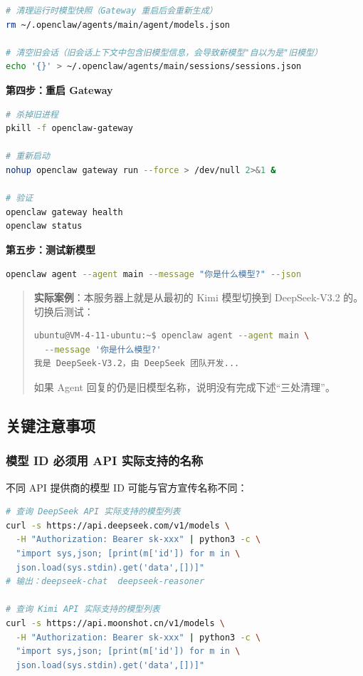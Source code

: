 \begin{lstlisting}[language=bash]
# 清理运行时模型快照（Gateway 重启后会重新生成）
rm ~/.openclaw/agents/main/agent/models.json

# 清空旧会话（旧会话上下文中包含旧模型信息，会导致新模型"自以为是"旧模型）
echo '{}' > ~/.openclaw/agents/main/sessions/sessions.json
\end{lstlisting}

\textbf{第四步：重启 Gateway}

\begin{lstlisting}[language=bash]
# 杀掉旧进程
pkill -f openclaw-gateway

# 重新启动
nohup openclaw gateway run --force > /dev/null 2>&1 &

# 验证
openclaw gateway health
openclaw status
\end{lstlisting}

\textbf{第五步：测试新模型}

\begin{lstlisting}[language=bash]
openclaw agent --agent main --message "你是什么模型?" --json
\end{lstlisting}

\begin{quote}
\textbf{实际案例}：本服务器上就是从最初的 Kimi 模型切换到 DeepSeek-V3.2 的。切换后测试：
\begin{lstlisting}[language=bash]
ubuntu@VM-4-11-ubuntu:~$ openclaw agent --agent main \
  --message '你是什么模型?'
我是 DeepSeek-V3.2，由 DeepSeek 团队开发...
\end{lstlisting}
如果 Agent 回复的仍是旧模型名称，说明没有完成下述“三处清理”。
\end{quote}

\subsection{关键注意事项}


\subsubsection{模型 ID 必须用 API 实际支持的名称}


不同 API 提供商的模型 ID 可能与官方宣传名称不同：

\begin{lstlisting}[language=bash]
# 查询 DeepSeek API 实际支持的模型列表
curl -s https://api.deepseek.com/v1/models \
  -H "Authorization: Bearer sk-xxx" | python3 -c \
  "import sys,json; [print(m['id']) for m in \
  json.load(sys.stdin).get('data',[])]"
# 输出：deepseek-chat  deepseek-reasoner

# 查询 Kimi API 实际支持的模型列表
curl -s https://api.moonshot.cn/v1/models \
  -H "Authorization: Bearer sk-xxx" | python3 -c \
  "import sys,json; [print(m['id']) for m in \
  json.load(sys.stdin).get('data',[])]"
\end{lstlisting}

